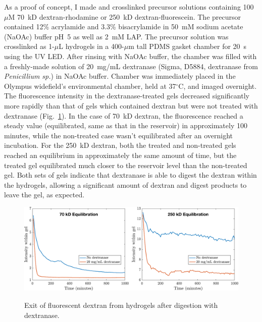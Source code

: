 As a proof of concept, I made and crosslinked precursor solutions containing 100~$\mu$M 70~kD dextran-rhodamine or 250~kD dextran-fluorescein.  The precursor contained 12\% acrylamide and 3.3\% bisacrylamide in 50~mM sodium acetate (NaOAc) buffer pH~5 as well as 2~mM LAP.  The precursor solution was crosslinked as 1-$\mu$L hydrogels in a 400-$\mu$m tall PDMS gasket chamber for 20~s using the UV LED.  After rinsing with NaOAc buffer, the chamber was filled with a freshly-made solution of 20~mg/mL dextranase (Sigma, D5884, dextranase from \textit{Penicillium sp.}) in NaOAc buffer.  Chamber was immediately placed in the Olympus widefield's environmental chamber, held at 37$^\circ$C, and imaged overnight. The fluorescence intensity in the dextranase-treated gels decreased significantly more rapidly than that of gels which contained dextran but were not treated with dextranase (Fig.~\ref{fig:dxase-equilibration}).  In the case of 70~kD dextran, the fluorescence reached a steady value (equilibrated, same as that in the reservoir) in approximately 100 minutes, while the non-treated case wasn't equilibrated after an overnight incubation.  For the 250~kD dextran, both the treated and non-treated gels reached an equilibrium in approximately the same amount of time, but the treated gel equilibrated much closer to the reservoir level than the non-treated gel.  Both sets of gels indicate that dextranase is able to digest the dextran within the hydrogels, allowing a significant amount of dextran and digest products to leave the gel, as expected.
\begin{figure}
\caption{Exit of fluorescent dextran from hydrogels after digestion with dextranase.}
\centering
\includegraphics[width=\textwidth]{figs/ch03/dxase-equilibration}
\label{fig:dxase-equilibration}
\end{figure}

